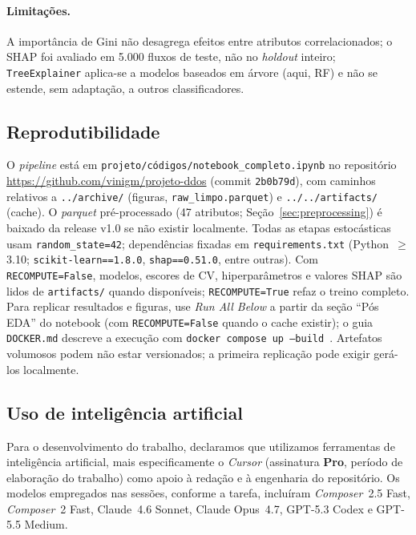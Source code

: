 \documentclass[12pt]{article}
\makeatletter
\newlength{\sbcblockmargin}
\newenvironment{sbcnarrowblock}{%
  \list{}{%
    \topsep\z@
    \partopsep\z@
    \itemsep\z@
    \parsep\z@
    \leftmargin=\sbcblockmargin
    \rightmargin=\sbcblockmargin
    \listparindent=\parindent
    \itemindent=\z@
    \labelwidth=\z@
    \labelsep=\z@
  }\item\relax}
{\endlist}
\makeatother
\begin{document}
\begin{sbcnarrowblock}
\paragraph{Limitações.}
A importância de Gini não desagrega efeitos entre atributos correlacionados; o SHAP foi avaliado em 5.000 fluxos de teste, não no \textit{holdout} inteiro; \texttt{TreeExplainer} aplica-se a modelos baseados em árvore (aqui, RF) e não se estende, sem adaptação, a outros classificadores.

\FloatBarrier

\subsection{Reprodutibilidade}
\label{sec:reproducibility}

O \textit{pipeline} está em \texttt{projeto/códigos/notebook\_completo.ipynb} no repositório \url{https://github.com/vinigm/projeto-ddos} (commit \texttt{2b0b79d}), com caminhos relativos a \texttt{../archive/} (figuras, \texttt{raw\_limpo.parquet}) e \texttt{../../artifacts/} (cache).
O \textit{parquet} pré-processado (47 atributos; Seção~\ref{sec:preprocessing}) é baixado da release v1.0 se não existir localmente.
Todas as etapas estocásticas usam \texttt{random\_state=42}; dependências fixadas em \texttt{requirements.txt} (Python~$\geq$3.10; \texttt{scikit-learn==1.8.0}, \texttt{shap==0.51.0}, entre outras).
Com \texttt{RECOMPUTE=False}, modelos, escores de CV, hiperparâmetros e valores SHAP são lidos de \texttt{artifacts/} quando disponíveis; \texttt{RECOMPUTE=True} refaz o treino completo.
Para replicar resultados e figuras, use \textit{Run All Below} a partir da seção ``Pós EDA'' do notebook (com \texttt{RECOMPUTE=False} quando o cache existir); o guia \texttt{DOCKER.md} descreve a execução com \texttt{docker compose up --build}~\cite{boettiger2015docker}.
Artefatos volumosos podem não estar versionados; a primeira replicação pode exigir gerá-los localmente.

\subsection{Uso de inteligência artificial}
\label{sec:ai-usage}

Para o desenvolvimento do trabalho, declaramos que utilizamos ferramentas de inteligência artificial, mais especificamente o \textit{Cursor} (assinatura \textbf{Pro}, período de elaboração do trabalho) como apoio à redação e à engenharia do repositório.
Os modelos empregados nas sessões, conforme a tarefa, incluíram \textit{Composer}~2.5 Fast, \textit{Composer}~2 Fast, Claude~4.6 Sonnet, Claude Opus~4.7, GPT-5.3 Codex e GPT-5.5 Medium.


\end{sbcnarrowblock}
\end{document}

